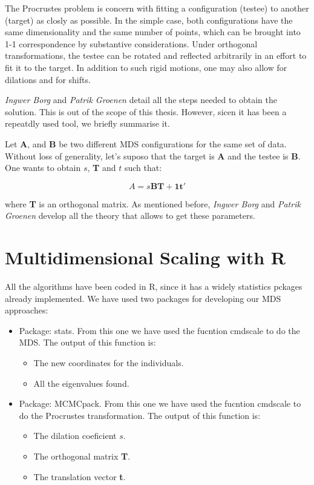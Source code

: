 \documentclass[11pt]{report}
\begin{document}
\indent The Procrustes problem is concern with fitting a configuration (testee)
to another (target) as closly as possible. In the simple case, both 
configurations have the same dimensionality and the same number of points, which
can be brought into 1-1 correspondence by substantive considerations. Under
orthogonal transformations, the testee can be rotated and reflected arbitrarily
in an effort to fit it to the target. In addition to such rigid motions, one 
may also allow for dilations and for shifts.

\indent \textit{Ingwer Borg} and \textit{Patrik Groenen} detail all the steps 
needed to obtain the solution\cite{BorgGroenen2005}. This is out of the scope of 
this thesis. However, sicen it has been a repeatdly used tool, we briefly 
summarise it. 

\indent Let \textbf{A}, and \textbf{B} be two different MDS configurations for
the same set of data. Without loss of generality, let's suposo that the target 
is \textbf{A} and the testee is \textbf{B}. One wants to obtain $s$, \textbf{T}
and $t$ such that:

$$A = s \mathbf{B} \mathbf{T} + \mathbf{1t}'$$

where \textbf{T} is an orthogonal matrix. As mentioned before, \textit{Ingwer Borg} 
and \textit{Patrik Groenen} develop all the theory\cite{BorgGroenen2005} that 
allows to get these parameters.

\section{Multidimensional Scaling with \textsf{R}}

All the algorithms have been coded in \textsf{R}, since it has a widely statistics
pckages already implemented. We have used two packages for developing our MDS
approaches:

\begin{itemize}
\item Package: \textsf{stats}. From this one we have used the fucntion 
\textsf{cmdscale} to do the MDS. The output of this function is:
\begin{itemize}
\item The new coordinates for the individuals.
\item All the eigenvalues found.
\end{itemize}
\item Package: \textsf{MCMCpack}. From this one we have used the fucntion 
\textsf{cmdscale} to do the Procrustes transformation. The output of 
this function is:
\begin{itemize}
\item The dilation coeficient $s$.
\item The orthogonal matrix \textbf{T}.
\item The translation vector \textbf{t}.
\end{itemize}
\end{itemize}
\end{document}
